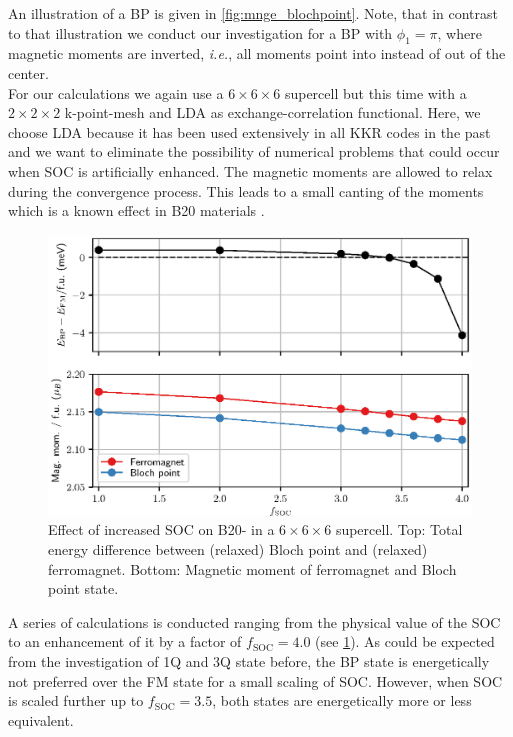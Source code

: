 \documentclass [a4paper, 12pt]{article}
\begin{document}
An illustration of a BP is given in \cref{fig:mnge_blochpoint}. Note, that in contrast to
that illustration we conduct our investigation for a BP with $\phi_{1}=\pi$, where magnetic moments
are inverted, \textit{i.e.}, all moments point into instead of out of the center.
\\
For our calculations we
again use a $6\times 6\times 6$ supercell but this time with a $2\times 2\times 2$ k-point-mesh and LDA as
exchange-correlation functional. Here, we choose LDA because it has been used extensively in all KKR codes
in the past and 
we want to eliminate the possibility of numerical problems that could occur when SOC is artificially enhanced.
The magnetic moments are allowed to relax during the convergence process.
This leads to a small canting of the moments which is a known effect in
B20 materials \cite{chizhikov_multishell_2013}.
\begin{figure}[!htb]
  \centering
   \includegraphics[width=1.00\textwidth]{Figures/MnGe_ferro_bp.eps}
	\caption{Effect of increased SOC on B20- in a $6\times 6\times 6$ supercell.
	Top: Total energy difference between (relaxed) Bloch point and (relaxed) ferromagnet.
	Bottom: Magnetic moment of ferromagnet and Bloch point state.}
\label{fig:MnGe_kkrnano_comparison_bp}
\end{figure}
A series of calculations is conducted ranging from the physical value of the SOC 
to
an enhancement of it by a
factor of $f_{\text{SOC}}=4.0$ (see \cref{fig:MnGe_kkrnano_comparison_bp}).
As could be expected from the investigation of 1Q and 3Q state before,
the BP state is energetically not preferred over the FM state for a small
scaling of SOC.
However, when SOC is scaled further up to $f_{\text{SOC}}=3.5$,
both states are energetically more or less equivalent.
\end{document}
